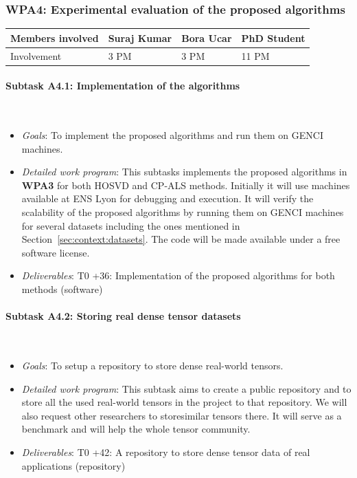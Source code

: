 \documentclass[a4paper,11pt]{article}
\newcommand{\subtask}[1]{{\color{orange}\paragraph{#1}$ $}}
\newcommand{\goal}{{\color{orange2}  \emph{Goals}:} }
\newcommand{\dwp}{{\color{orange2}  \emph{Detailed work program}: }}
\newcommand{\deliverables}{{\color{orange2}  \emph{Deliverables}: }}
\begin{document}
	\vspace*{-0.635cm}\subsubsection{\textbf{WPA4}: Experimental evaluation of the proposed algorithms}
	\vspace*{-0.385cm}\begin{table}[H]
		\begin{tabular}{llll}
			\hline
			\cellcolor{blue2}
			Members involved & Suraj Kumar& Bora Ucar & PhD Student \\
			\hline
			\cellcolor{orange2}
			Involvement      & 3 PM            & 3 PM & 11 PM \\
			\hline
		\end{tabular}
	\end{table}\vspace*{-0.25cm}
	\subtask{Subtask A4.1: Implementation of the algorithms}
	\begin{itemize}[leftmargin=-1pt]
		\item[] \goal To implement the proposed algorithms and run them on GENCI machines.
		\item[] \dwp This subtasks implements the proposed algorithms in \textbf{WPA3} for both HOSVD and CP-ALS methods. Initially it will use machines available at ENS Lyon for debugging and execution. It will verify the scalability of the proposed algorithms by running them on GENCI machines for several datasets including the ones mentioned in Section~\ref{sec:context:datasets}. The code will be made available under a free software license.
		\item[] \deliverables T0 +36: Implementation of the proposed algorithms for both methods (software)	
	\end{itemize}
		\subtask{Subtask A4.2: Storing real dense tensor datasets}
	\begin{itemize}[leftmargin=-1pt]
		\item[] \goal To setup a repository to store dense real-world tensors.
		\item[] \dwp This subtask aims to create a public repository and to store all the used real-world tensors in the project to that repository. We will also request other researchers to store\linebreak similar tensors there. It will serve as a benchmark and will help the whole tensor community.
		\item[] \deliverables T0 +42: A repository to store dense tensor data of real applications (repository)	
	\end{itemize}
\end{document}
